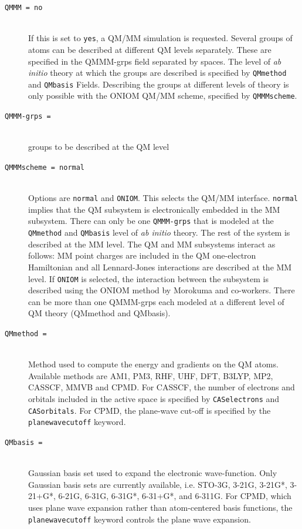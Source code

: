 \begin{description}

\item[\tt QMMM = no]\mbox{}\\ If this is set to {\tt yes}, a QM/MM
simulation is requested. Several groups of atoms can be described at
different QM levels separately. These are specified in the QMMM-grps
field separated by spaces. The level of {\it{ab initio}} theory at which the
groups are described is specified by {\tt QMmethod} and {\tt QMbasis}
Fields. Describing the groups at different levels of theory is only
possible with the ONIOM QM/MM scheme, specified by {\tt QMMMscheme}.

\item[\tt QMMM-grps =]\mbox{}\\groups to be described at the QM level

\item[\tt QMMMscheme = normal]\mbox{}\\Options are {\tt normal} and
{\tt ONIOM}. This selects the QM/MM interface. {\tt normal} implies
that the QM subsystem is electronically embedded in the MM
subsystem. There can only be one {\tt QMMM-grps} that is modeled at
the {\tt QMmethod} and {\tt QMbasis} level of {\it{ ab initio}}
theory. The rest of the system is described at the MM level. The QM
and MM subsystems interact as follows: MM point charges are included
in the QM one-electron Hamiltonian and all Lennard-Jones interactions
are described at the MM level. If {\tt ONIOM} is selected, the
interaction between the subsystem is described using the ONIOM method
by Morokuma and co-workers. There can be more than one QMMM-grps each
modeled at a different level of QM theory (QMmethod and QMbasis).

\item[\tt QMmethod = ]\mbox{}\\Method used to compute the energy
and gradients on the QM atoms. Available methods are AM1, PM3, RHF,
UHF, DFT, B3LYP, MP2, CASSCF, MMVB and CPMD. For CASSCF, the number of
electrons and orbitals included in the active space is specified by
{\tt CASelectrons} and {\tt CASorbitals}. For CPMD, the plane-wave
cut-off is specified by the {\tt planewavecutoff} keyword.

\item[\tt QMbasis = ]\mbox{}\\Gaussian basis set used to expand the
electronic wave-function. Only Gaussian basis sets are currently
available, i.e. STO-3G, 3-21G, 3-21G*, 3-21+G*, 6-21G, 6-31G, 6-31G*,
6-31+G*, and 6-311G. For CPMD, which uses plane wave expansion rather
than atom-centered basis functions, the {\tt planewavecutoff} keyword
controls the plane wave expansion.


\end{description}
